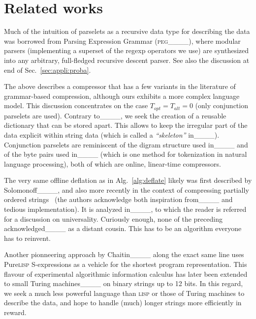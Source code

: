 \section{Related works}
Much of the intuition of parselets as a recursive data type for describing the data was borrowed from Parsing Expression Grammar (\textsc{peg}____), where modular parsers (implementing a superset of the regexp operators we use) are synthesized into any arbitrary, full-fledged recursive descent parser. See also the discussion at end of Sec.~\ref{sec:appli:proba}.

The above describes a compressor that has a few variants in the literature of grammar-based compression, although ours exhibits a more complex language model. This discussion concentrates on the case $T_{opt}=T_{alt}=0$ (only conjunction parselets are used). Contrary to____, we seek the creation of a reusable dictionary that can be stored apart. This allows to keep the irregular part of the data explicit within string data (which is called a {\em ``skeleton''} in____). Conjunction parselets are reminiscent of the digram structure used in____ and of the byte pairs used in____ (which is one method for tokenization in natural language processing), both of which are online, linear-time compressors. 

The very same offline deflation as in Alg.~\ref{alg:deflate} likely was first described by Solomonoff____, and also more recently in the context of compressing partially ordered strings~\cite[Sec.~3.2]{alur:2003} (the authors acknowledge both inspiration from____ and tedious implementation). It is analyzed in____, to which the reader is referred for a discussion on universality. Curiously enough, none of the preceding acknowledged____ as a distant cousin. This has to be an algorithm everyone has to reinvent. 

Another pionneering approach by Chaitin____ along the exact same line uses Pure\textsc{lisp} S-expressions as a vehicle for the shortest program representation. This flavour of experimental algorithmic information calculus has later been extended to small Turing machines____ on binary strings up to 12 bits. In this regard, we seek a much less powerful language than \textsc{lisp} or those of Turing machines to describe the data, and hope to handle (much) longer strings more efficiently in reward. 

